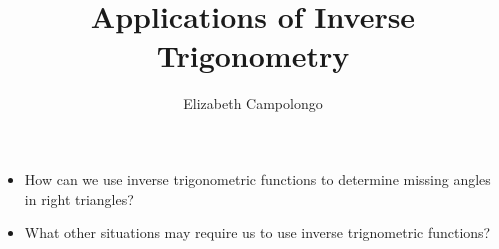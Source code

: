 \documentclass{ximera}
\author{Elizabeth Campolongo}
\title{Applications of Inverse Trigonometry}
\begin{document}
\begin{abstract}
  
\end{abstract}
\maketitle



\begin{motivatingQuestions}\begin{itemize}
\item How can we use inverse trigonometric functions to determine missing angles in right triangles?
\item What other situations may require us to use inverse trignometric functions?
\end{itemize}\end{motivatingQuestions}


\end{document}
